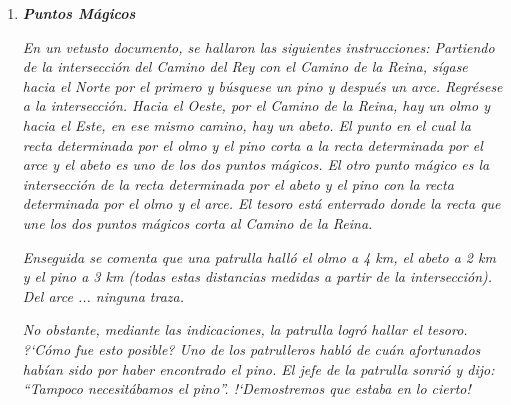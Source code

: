 \begin{enumerate}
\vspace{-6mm}
\begin{flushright}
\begin{footnotesize} \textcolor{gris}{}	\end{footnotesize}
\end{flushright}


\item	\textbf{\emph{Puntos Mágicos}}
\vspace{2mm}
\begin{destacado} 
\begin{adjustwidth}{20pt}{20pt}
\vspace{1mm}
\color{NavyBlue}
\vspace{2mm} \emph{En un vetusto documento, se hallaron las siguientes instrucciones: Partiendo de la intersección del Camino del Rey con el Camino de la Reina, sígase hacia el Norte por el primero y búsquese un pino y después un arce. Regrésese a la intersección. Hacia el Oeste, por el Camino de la Reina, hay un olmo y hacia el Este, en ese mismo camino, hay un abeto. El punto en el cual la recta determinada por el olmo y el pino corta a la recta determinada por el arce y el abeto es uno de los dos puntos mágicos. El otro punto mágico es la intersección de la recta determinada por el abeto y el pino con la recta determinada por el olmo y el arce. El tesoro está enterrado donde la recta que une los dos puntos mágicos corta al Camino de la Reina.} 

\vspace{2mm} \emph{Enseguida se comenta que una patrulla halló el olmo a 4 km, el abeto a 2 km y el pino a 3 km (todas estas distancias medidas a partir de la intersección). Del arce ... ninguna traza.}

\vspace{2mm} \emph{No obstante, mediante las indicaciones, la patrulla logró hallar el tesoro. ?`Cómo fue esto posible? Uno de los patrulleros habló de cuán afortunados habían sido por haber encontrado el pino. El jefe de la patrulla sonrió y dijo: ``Tampoco necesitábamos el pino''. !`Demostremos que estaba en lo cierto! }
\color{Black}
\vspace{1mm}
\end{adjustwidth}
\end{destacado}

\vspace{-6mm}
\begin{flushright}
\begin{footnotesize} \textcolor{gris}{}	\end{footnotesize}
\end{flushright}





\end{enumerate}
